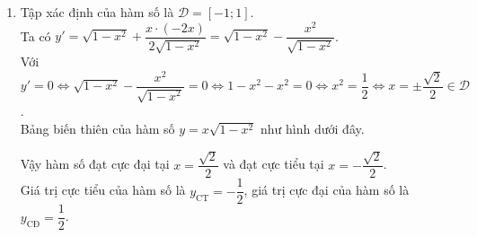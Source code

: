 \begin{bt}
{\begin{enumerate}
\begin{center}
\begin{tikzpicture}
                \end{tikzpicture}
            \end{center}
            Vậy hàm số đạt cực đại tại $x=-3$ và đạt cực tiểu tại $x=-1$.\\
            Giá trị cực tiểu của hàm số là $y_{\text{CT}}=1$, giá trị cực đại của hàm số là $y_{\text{CĐ}}=-3$.
            \item
            Tập xác định của hàm số là $\mathscr{D}=[-1;1]$.\\
            Ta có $y'=\sqrt{1-x^2}+\dfrac{x\cdot(-2x)}{2\sqrt{1-x^2}}=\sqrt{1-x^2}-\dfrac{x^2}{\sqrt{1-x^2}}$.\\
            Với $y'=0\Leftrightarrow \sqrt{1-x^2}-\dfrac{x^2}{\sqrt{1-x^2}}=0\Leftrightarrow 1-x^2-x^2=0\Leftrightarrow x^2=\dfrac{1}{2}\Leftrightarrow x=\pm\dfrac{\sqrt{2}}{2}\in\mathscr{D}$.\\
            Bảng biến thiên của hàm số $y=x\sqrt{1-x^2}$ như hình dưới đây.
            \begin{center}
            \end{center}
            Vậy hàm số đạt cực đại tại $x=\dfrac{\sqrt{2}}{2}$ và đạt cực tiểu tại $x=-\dfrac{\sqrt{2}}{2}$.\\
            Giá trị cực tiểu của hàm số là $y_{\text{CT}}=-\dfrac{1}{2}$, giá trị cực đại của hàm số là $y_{\text{CĐ}}=\dfrac{1}{2}$.
        \end{enumerate}
    }
\end{bt}
